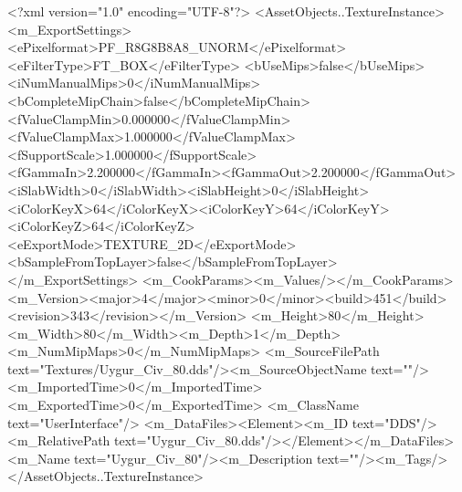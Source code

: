 <?xml version="1.0" encoding="UTF-8"?>
<AssetObjects..TextureInstance>
  <m_ExportSettings>
    <ePixelformat>PF_R8G8B8A8_UNORM</ePixelformat><eFilterType>FT_BOX</eFilterType>
    <bUseMips>false</bUseMips><iNumManualMips>0</iNumManualMips><bCompleteMipChain>false</bCompleteMipChain>
    <fValueClampMin>0.000000</fValueClampMin><fValueClampMax>1.000000</fValueClampMax><fSupportScale>1.000000</fSupportScale>
    <fGammaIn>2.200000</fGammaIn><fGammaOut>2.200000</fGammaOut><iSlabWidth>0</iSlabWidth><iSlabHeight>0</iSlabHeight>
    <iColorKeyX>64</iColorKeyX><iColorKeyY>64</iColorKeyY><iColorKeyZ>64</iColorKeyZ>
    <eExportMode>TEXTURE_2D</eExportMode><bSampleFromTopLayer>false</bSampleFromTopLayer>
  </m_ExportSettings>
  <m_CookParams><m_Values/></m_CookParams>
  <m_Version><major>4</major><minor>0</minor><build>451</build><revision>343</revision></m_Version>
  <m_Height>80</m_Height><m_Width>80</m_Width><m_Depth>1</m_Depth><m_NumMipMaps>0</m_NumMipMaps>
  <m_SourceFilePath text="Textures/Uygur_Civ_80.dds"/><m_SourceObjectName text=""/>
  <m_ImportedTime>0</m_ImportedTime><m_ExportedTime>0</m_ExportedTime>
  <m_ClassName text="UserInterface"/>
  <m_DataFiles><Element><m_ID text="DDS"/><m_RelativePath text="Uygur_Civ_80.dds"/></Element></m_DataFiles>
  <m_Name text="Uygur_Civ_80"/><m_Description text=""/><m_Tags/>
</AssetObjects..TextureInstance>
